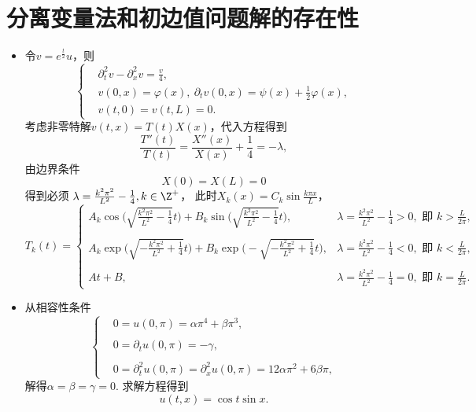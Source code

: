 \section{分离变量法和初边值问题解的存在性}
\begin{itemize}
\item[2.] 令$v=e^{\frac{t}{2}}u$，则
\begin{equation*}
    \left\{\begin{aligned}
        &\partial_t^2v-\partial_x^2v=\frac{v}{4},\\
        &v(0,x)=\varphi(x),\ \partial_tv(0,x)=\psi(x)+\frac{1}{2}\varphi(x),\\
        &v(t,0)=v(t,L)=0.
    \end{aligned}\right.
\end{equation*}
考虑非零特解$v(t,x)=T(t)X(x)$，代入方程得到
\[\frac{T''(t)}{T(t)}=\frac{X''(x)}{X(x)}+\frac{1}{4}=-\lambda,\]
由边界条件$$X(0)=X(L)=0$$得到必须
$\lambda=\frac{k^2\pi^2}{L^2}-\frac{1}{4},k\in\Z^+$，
此时$X_k(x)=C_k\sin\frac{k\pi x}{L}$，
$$T_k(t)=\begin{cases}
    A_k\cos\Big(\sqrt{\frac{k^2\pi^2}{L^2}-\frac{1}{4}}t\Big)+
    B_k\sin\Big(\sqrt{\frac{k^2\pi^2}{L^2}-\frac{1}{4}}t\Big),
    &\lambda=\frac{k^2\pi^2}{L^2}-\frac{1}{4}>0,\text{ 即 }k>\frac{L}{2\pi},\\ \\
    A_k\exp\Big(\sqrt{-\frac{k^2\pi^2}{L^2}+\frac{1}{4}}t\Big)+
    B_k\exp\Big(\!-\!\sqrt{-\frac{k^2\pi^2}{L^2}+\frac{1}{4}}t\Big),
    &\lambda=\frac{k^2\pi^2}{L^2}-\frac{1}{4}<0,\text{ 即 }k<\frac{L}{2\pi},\\ \\
    At+B,
    &\lambda=\frac{k^2\pi^2}{L^2}-\frac{1}{4}=0,\text{ 即 }k=\frac{L}{2\pi}.
\end{cases}$$

\item[3.] 从相容性条件\begin{equation*}
    \left\{\begin{aligned}
        &0=u(0,\pi)=\alpha\pi^4+\beta\pi^3,\\ \\
        &0=\partial_t u(0,\pi)=-\gamma,\\ \\
        &0=\partial^2_t u(0,\pi)=\partial^2_x u(0,\pi)=12\alpha\pi^2+6\beta\pi,
    \end{aligned}\right.
\end{equation*}
解得$\alpha=\beta=\gamma=0$.
求解方程得到$$u(t,x)=\cos t\sin x.$$


\end{itemize}
